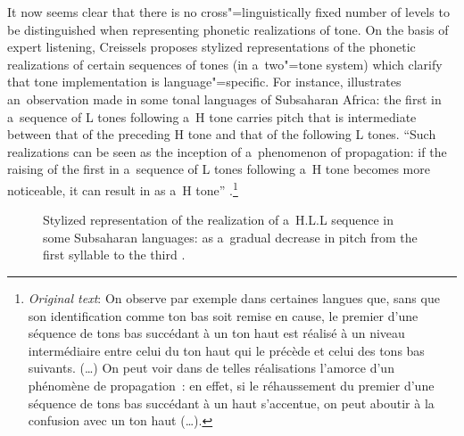 It now seems clear that there is no cross"=linguistically fixed number of levels to be distinguished when representing phonetic realizations of tone. On the basis of expert listening, Creissels proposes stylized representations of the phonetic realizations of certain sequences of tones (in a~two"=tone system) which clarify that tone implementation is language"=specific. For instance,  illustrates an~observation made in some tonal languages of Subsaharan Africa: the first in a~sequence of L tones following a~H tone carries pitch that is intermediate between that of the preceding H tone and that of the following L tones. ``Such realizations can be seen as the inception of a~phenomenon of propagation: if the raising of the first in a~sequence of L tones following a~H tone becomes more noticeable, it can result in  as a~H tone'' \citep[215--216]{creissels1994}.\footnote{\textit{Original text}: On observe par exemple dans certaines langues que, sans que son identification comme ton bas soit remise en cause, le premier d'une séquence de tons bas succédant à un ton haut est réalisé à un niveau intermédiaire entre celui du ton haut qui le précède et celui des tons bas suivants. ({\dots}) On peut voir dans de telles réalisations l'amorce d'un phénomène de propagation~: en effet, si le réhaussement du premier d'une séquence de tons bas succédant à un haut s'accentue, on peut aboutir à la confusion avec un ton haut ({\dots}).}

\begin{figure}
\centering
\caption{Stylized representation of the realization of a~H.L.L sequence in some Subsaharan languages: as a~gradual decrease in pitch from the first syllable to the third \citep[217]{creissels1994}.}
\label{fig:notes}
\end{figure}

